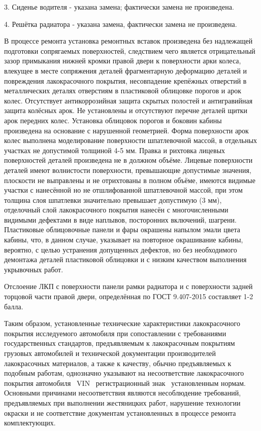 {  3. Сиденье водителя - указана замена; фактически замена не произведена.
  
  4. Решётка радиатора - указана замена, фактически замена не произведена.
  
  
  
  \indent В   процессе ремонта установка ремонтных вставок произведена без надлежащей подготовки сопрягаемых поверхностей, следствием чего является отрицательный зазор примыкания нижней кромки правой двери к поверхности арки колеса, влекущее в месте сопряжения деталей фрагментарную деформацию деталей и повреждения лакокрасочного покрытия,  несовпадение крепёжных отверстий в металлических деталях отверстиям в пластиковой облицовке порогов и арок колес. Отсутствует антикоррозийная защита скрытых полостей и антигравийная защита колёсных арок. Не установлены и отсутствуют  перечне деталей щитки арок передних колес. Установка облицовок порогов и боковин кабины произведена на основание с нарушенной геометрией. Форма поверхности арок колес выполнена моделирование поверхности шпатлевочной массой, в отдельных участках не допустимой толщиной 4-5 мм. Правка и рихтовка лицевых поверхностей  деталей произведена не в должном объёме. Лицевые поверхности деталей  имеют волнистости поверхности, превышающие допустимые значения, плоскости не   выправлены и не отрихтованы в полном объёме, имеются видимые участки с нанесённой но не отшлифованной шпатлевочной массой, при этом толщина слоя шпатлевки  значительно превышает допустимую (3 мм), отделочный слой  лакокрасочного покрытия нанесён с многочисленными видимыми дефектами в виде наплывов, посторонних включений, шагрени. Пластиковые облицовочные панели и фары окрашены напылом эмали цвета кабины,  что, в данном случае, указывает на повторное окрашивание кабины, вероятно, с целью устранения допущенных дефектов, но без необходимого демонтажа деталей пластиковой облицовки и с низким качеством выполнения укрывочных работ.
  
Отслоение ЛКП с поверхности панели рамки радиатора и  с поверхности  задней  торцовой части правой двери, определённая  по ГОСТ 9.407-2015  составляет 1-2 балла.
  	

  
  Таким образом, установленные технические характеристики лакокрасочного
  покрытия исследуемого автомобиля при сопоставлении с требованиями государственных
  стандартов, предъявляемым к лакокрасочным покрытиям грузовых автомобилей и
  технической документации производителей лакокрасочных материалов, а также к качеству, обычно предъявляемых к подобным работам,  однозначно
  указывают на несоответствие лакокрасочного покрытия автомобиля \tc\, VIN
  \, регистрационный знак \, установленным нормам. Основными
  причинами несоответствия  являются несоблюдение требований, предъявляемых при выполнении жестяницких работ,    нарушение технологии   окраски и не соответствие документам  установленных в процессе ремонта комплектующих. 
  
}
